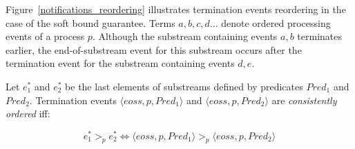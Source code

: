 Figure~\ref{notifications_reordering} illustrates termination events reordering in the case of the soft bound guarantee. Terms $a,b,c,d...$ denote ordered processing events of a process $p$. Although the substream containing events $a,b$ terminates earlier, the end-of-substream event for this substream occurs after the termination event for the substream containing events $d,e$. 

\begin{definition}
Let $e^{*}_1$ and $e^{*}_2$ be the last elements of substreams defined by predicates $Pred_1$ and $Pred_2$. Termination events $\langle eoss, p, Pred_1\rangle$ and $\langle eoss, p, Pred_2\rangle$ are {\em consistently ordered} iff:

\begin{equation}
e^{*}_1 >_p e^{*}_2 \Leftrightarrow \langle eoss, p, Pred_1\rangle >_p \langle eoss, p, Pred_2\rangle
\end{equation}
\end{definition}
